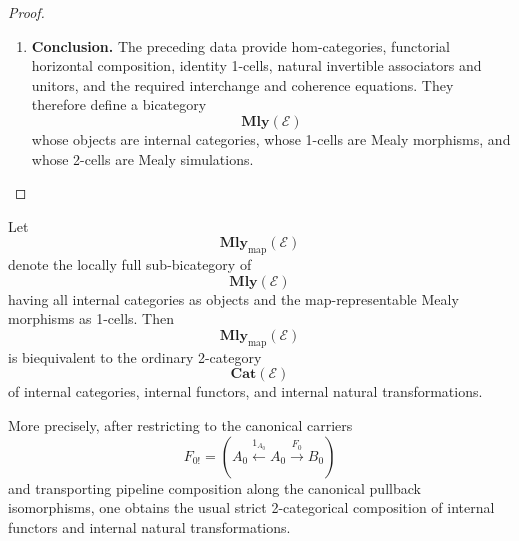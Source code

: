 \begin{proof}
\begin{enumerate}
        \item \textbf{Conclusion.}
        The preceding data provide hom-categories, functorial horizontal
        composition, identity 1-cells, natural invertible associators and
        unitors, and the required interchange and coherence equations. They
        therefore define a bicategory
        \[
            \mathbf{Mly}(\mathcal E)
        \]
        whose objects are internal categories, whose 1-cells are Mealy
        morphisms, and whose 2-cells are Mealy simulations.
    \end{enumerate}
\end{proof}

\begin{corollary}
\label{cor:functorial-sub-bicategory}
    Let
    \[
        \mathbf{Mly}_{\mathrm{map}}(\mathcal E)
    \]
    denote the locally full sub-bicategory of
    \[
        \mathbf{Mly}(\mathcal E)
    \]
    having all internal categories as objects and the map-representable Mealy
    morphisms as 1-cells. Then
    \[
        \mathbf{Mly}_{\mathrm{map}}(\mathcal E)
    \]
    is biequivalent to the ordinary 2-category
    \[
        \mathbf{Cat}(\mathcal E)
    \]
    of internal categories, internal functors, and internal natural
    transformations.

    More precisely, after restricting to the canonical carriers
    \[
        F_{0!}
        =
        \left(
            A_0
            \xleftarrow{1_{A_0}}
            A_0
            \xrightarrow{F_0}
            B_0
        \right)
    \]
    and transporting pipeline composition along the canonical pullback
    isomorphisms, one obtains the usual strict 2-categorical composition of
    internal functors and internal natural transformations.
\end{corollary}
